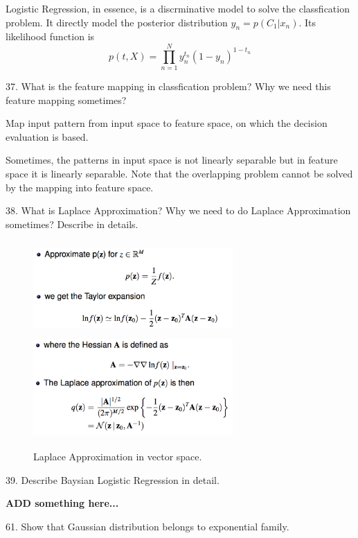 \documentclass[11pt,a4paper]{article}
\newcommand{\BOLD}[1]{\textbf{#1}}
\begin{document}
    Logistic Regression, in essence, is a discrminative model to solve the classfication problem. It directly model the posterior distribution $y_n = p(C_1 | x_n)$. Its likelihood function is 
    $$ p(t,X) = \prod_{n=1}^{N} y_{n}^{t_n} (1 - y_n) ^{1 - t_n} $$


37. What is the feature mapping in classfication problem? Why we need this feature mapping sometimes?

    Map input pattern from input space to feature space, on which the decision evaluation is based. 

    Sometimes, the patterns in input space is not linearly separable but in feature space it is linearly separable. Note that the overlapping problem cannot be solved by the mapping into feature space.

38. What is Laplace Approximation? Why we need to do Laplace Approximation sometimes? Describe in details. 
{
    \begin{figure}[H] \centering
    \includegraphics[width=3in,height=1.4in]{./figure/Laplace_1.png}
    \includegraphics[width=3in,height=1.5in]{./figure/Laplace_2.png}
    \caption{Laplace Approximation in vector space.}
\end{figure}
}

39. Describe Baysian Logistic Regression in detail.

    \BOLD{ADD something here...}

    \newpage

61. Show that Gaussian distribution belongs to exponential family.
\end{document}
